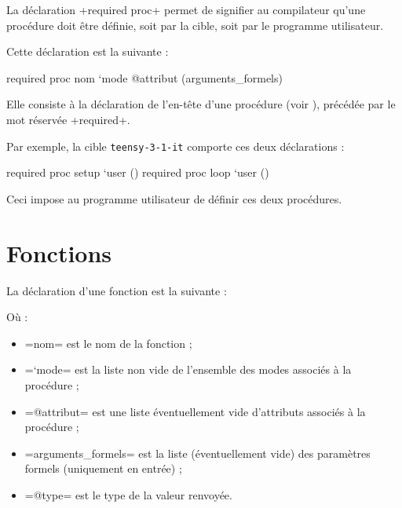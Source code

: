  






La déclaration \plm+required proc+ permet de signifier au compilateur qu'une procédure doit être définie, soit par la cible, soit par le programme utilisateur.

Cette déclaration est la suivante :
\begin{PLM}
required proc nom `mode @attribut (arguments_formels)
\end{PLM}

Elle consiste à la déclaration de l'en-tête d'une procédure (voir ), précédée par le mot réservée \plm+required+.

Par exemple, la cible \texttt{teensy-3-1-it} comporte ces deux déclarations :

\begin{PLM}
required proc setup `user ()
required proc loop `user ()
\end{PLM}

Ceci impose au programme utilisateur de définir ces deux procédures.









\section{Fonctions}


La déclaration d'une fonction est la suivante :
Où :
\begin{itemize}
  \item \plm=nom= est le nom de la fonction ;
  \item \plm=`mode= est la liste non vide de l'ensemble des modes associés à la procédure ;
  \item \plm=@attribut= est une liste éventuellement vide d'attributs associés à la procédure ;
  \item \plm=arguments_formels= est la liste (éventuellement vide) des paramètres formels (uniquement en entrée) ;
  \item \plm=@type= est le type de la valeur renvoyée.
\end{itemize}

